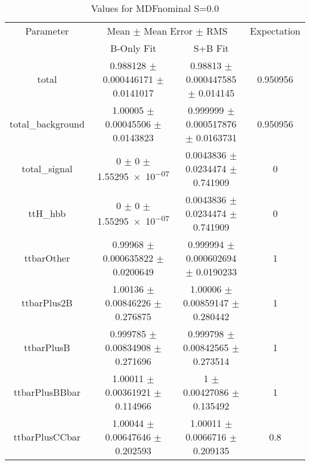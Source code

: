 \begin{table}
\centering
\caption{Values for MDFnominal S=0.0}
\begin{tabular}{cccc}
\toprule
Parameter & \multicolumn{2}{c}{Mean $\pm$ Mean Error $\pm$ RMS} & Expectation\\
 & B-Only Fit & S+B Fit & \\
\midrule
total & \num{0.988128} $\pm$ \num{0.000446171} $\pm$ \num{0.0141017} & \num{0.98813} $\pm$ \num{0.000447585} $\pm$ \num{0.014145} & \num{0.950956}\\
total\_background & \num{1.00005} $\pm$ \num{0.00045506} $\pm$ \num{0.0143823} & \num{0.999999} $\pm$ \num{0.000517876} $\pm$ \num{0.0163731} & \num{0.950956}\\
total\_signal & \num{0} $\pm$ \num{0} $\pm$ \num{1.55295e-07} & \num{0.0043836} $\pm$ \num{0.0234474} $\pm$ \num{0.741909} & \num{0}\\
ttH\_hbb & \num{0} $\pm$ \num{0} $\pm$ \num{1.55295e-07} & \num{0.0043836} $\pm$ \num{0.0234474} $\pm$ \num{0.741909} & \num{0}\\
ttbarOther & \num{0.99968} $\pm$ \num{0.000635822} $\pm$ \num{0.0200649} & \num{0.999994} $\pm$ \num{0.000602694} $\pm$ \num{0.0190233} & \num{1}\\
ttbarPlus2B & \num{1.00136} $\pm$ \num{0.00846226} $\pm$ \num{0.276875} & \num{1.00006} $\pm$ \num{0.00859147} $\pm$ \num{0.280442} & \num{1}\\
ttbarPlusB & \num{0.999785} $\pm$ \num{0.00834908} $\pm$ \num{0.271696} & \num{0.999798} $\pm$ \num{0.00842565} $\pm$ \num{0.273514} & \num{1}\\
ttbarPlusBBbar & \num{1.00011} $\pm$ \num{0.00361921} $\pm$ \num{0.114966} & \num{1} $\pm$ \num{0.00427086} $\pm$ \num{0.135492} & \num{1}\\
ttbarPlusCCbar & \num{1.00044} $\pm$ \num{0.00647646} $\pm$ \num{0.202593} & \num{1.00011} $\pm$ \num{0.0066716} $\pm$ \num{0.209135} & \num{0.8}\\
\bottomrule
\end{tabular}
\end{table}